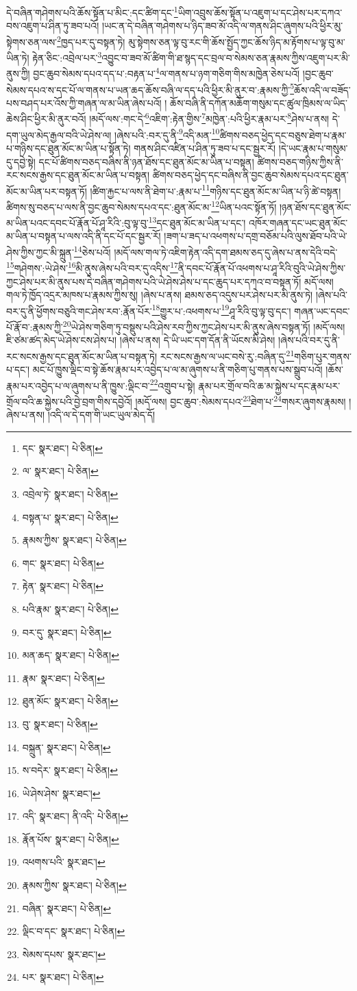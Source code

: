 དེ་བཞིན་གཤེགས་པའི་ཆོས་སྟོན་པ་མིང་:དང་ཚིག་དང་\footnote{དང་  སྣར་ཐང་།  པེ་ཅིན། }ཡིག་འབྲུས་ཆོས་སྟོན་པ་འཇུག་པ་དང་ཤེས་པར་དཀའ་བས་འཇུག་པ་ཤིན་ཏུ་ཟབ་པའོ། །ཡང་ན་དེ་བཞིན་གཤེགས་པ་ཉིད་ཟབ་མོ་འདི་ལ་གནས་ཤིང་ཞུགས་པའི་ཕྱིར་མུ་སྟེགས་ཅན་ལས་\footnote{ལ་  སྣར་ཐང་།  པེ་ཅིན། }ཁྱད་པར་དུ་བསྟན་ཏེ། མུ་སྟེགས་ཅན་ལྟ་བུ་རང་གི་ཆོས་སྤྱོད་ཀྱང་ཆོས་ཉིད་མ་རྟོགས་པ་ལྟ་བུ་མ་ཡིན་ཏེ། རྟེན་ཅིང་:འབྲེལ་པར་\footnote{འབྲེལ་ཏེ་  སྣར་ཐང་།  པེ་ཅིན། }འབྱུང་བ་ཟབ་མོ་ཚིག་གི་ཐ་སྙད་དང་བྲལ་བ་སེམས་ཅན་རྣམས་ཀྱིས་འཇུག་པར་མི་ནུས་ཀྱི། བྱང་ཆུབ་སེམས་དཔའ་དད་པ་:བརྟན་པ་\footnote{བསྟན་པ་  སྣར་ཐང་།  པེ་ཅིན། }ལ་གནས་པ་ཉག་གཅིག་གིས་མཁྱེན་ཅེས་པའོ། །བྱང་ཆུབ་སེམས་དཔའ་ས་དང་པོ་ལ་གནས་པ་ཡན་ཆད་ཆོས་བཞི་ལ་དད་པའི་ཕྱིར་མི་ནུར་བ་:རྣམས་ཀྱི་\footnote{རྣམས་ཀྱིས་  སྣར་ཐང་།  པེ་ཅིན། }ཆོས་འདི་ལ་བཟོད་པས་བཤད་པར་འོས་ཀྱི་གཞན་ལ་མ་ཡིན་ཞེས་པའོ། །
ཆོས་བཞི་ནི་དཀོན་མཆོག་གསུམ་དང་ཚུལ་ཁྲིམས་ལ་ཡིད་ཆེས་ཤིང་ཕྱིར་མི་ནུར་བའོ། །མདོ་ལས་:གང་དེ་\footnote{གང་  སྣར་ཐང་།  པེ་ཅིན། }འཇིག་:རྟེན་གྱིས་\footnote{རྟེན་  སྣར་ཐང་།  པེ་ཅིན། }མཁྱེན་:པའི་ཕྱིར་རྣམ་པར་\footnote{པའི་རྣམ་  སྣར་ཐང་།  པེ་ཅིན། }ཤེས་པ་ནས། དེ་དག་ཡུལ་མེད་རྒྱལ་བའི་ཡེ་ཤེས་ལ། །ཞེས་པའི་:བར་དུ་ནི་\footnote{བར་དུ་  སྣར་ཐང་།  པེ་ཅིན། }འདི་མན་\footnote{མན་ཆད་  སྣར་ཐང་།  པེ་ཅིན། }ཚིགས་བཅད་ཕྱེད་དང་བཅུས་ཐེག་པ་རྣམ་པ་གཉིས་དང་ཐུན་མོང་མ་ཡིན་པ་སྟོན་ཏེ། གནས་ཤིང་འཛིན་པ་ཤིན་ཏུ་ཟབ་པ་དང་སྦྱར་རོ། །དེ་ཡང་རྣམ་པ་གསུམ་དུ་དབྱེ་སྟེ། དང་པོ་ཚིགས་བཅད་བཞིས་ནི་ཉན་ཐོས་དང་ཐུན་མོང་མ་ཡིན་པ་བསྟན། ཚིགས་བཅད་གཉིས་ཀྱིས་ནི་རང་སངས་རྒྱས་དང་ཐུན་མོང་མ་ཡིན་པ་བསྟན། ཚིགས་བཅད་ཕྱེད་དང་བཞིས་ནི་བྱང་ཆུབ་སེམས་དཔའ་དང་ཐུན་མོང་མ་ཡིན་པར་བསྟན་ཏོ། །ཚིག་རྐྱང་པ་ལས་ནི་ཐེག་པ་:རྣམ་པ་\footnote{རྣམ་  སྣར་ཐང་།  པེ་ཅིན། }གཉིས་དང་ཐུན་མོང་མ་ཡིན་པ་ཉི་ཚེ་བསྟན། ཚིགས་སུ་བཅད་པ་ལས་ནི་བྱང་ཆུབ་སེམས་དཔའ་དང་:ཐུན་མོང་མ་\footnote{ཐུན་མོང་  སྣར་ཐང་།  པེ་ཅིན། }ཡིན་པའང་སྟོན་ཏོ། །ཉན་ཐོས་དང་ཐུན་མོང་མ་ཡིན་པའང་དབང་པོ་རྣོན་པོ་ཤཱ་རིའི་:བུ་ལྟ་བུ་\footnote{བུ་  སྣར་ཐང་།  པེ་ཅིན། }དང་ཐུན་མོང་མ་ཡིན་པ་དང་། འཁོར་གཞན་དང་ཡང་ཐུན་མོང་མ་ཡིན་པ་བསྟན་པ་ལས་འདི་ནི་དང་པོ་དང་སྦྱར་རོ། །ཟག་པ་ཟད་པ་འཕགས་པ་དགྲ་བཅོམ་པའི་ལུས་ཐོབ་པའི་ཡེ་ཤེས་ཀྱིས་ཀྱང་མི་སྐྲུན་\footnote{བསྐྲུན་  སྣར་ཐང་།  པེ་ཅིན། }ཅེས་པའོ། །མདོ་ལས་གལ་ཏེ་འཇིག་རྟེན་འདི་དག་ཐམས་ཅད་དུ་ཞེས་པ་ནས་དེའི་བདེ་\footnote{ས་བདེར་  སྣར་ཐང་།  པེ་ཅིན། }གཤེགས་:ཡེ་ཤེས་\footnote{ཡེ་ཤེས་ཤེས་  སྣར་ཐང་། }མི་ནུས་ཞེས་པའི་བར་དུ་འདིས་\footnote{འདི་  སྣར་ཐང་། ནི་འདི་  པེ་ཅིན། }ནི་དབང་པོ་རྣོན་པོ་འཕགས་པ་ཤཱ་རིའི་བུའི་ཡེ་ཤེས་ཀྱིས་ཀྱང་ཤེས་པར་མི་ནུས་པས་དེ་བཞིན་གཤེགས་པའི་ཡེ་ཤེས་ཤེས་པ་དང་ཆུད་པར་དཀའ་བ་བསྟན་ཏོ། མདོ་ལས། གལ་ཏེ་ཁྱོད་འདྲར་མཁས་པ་རྣམས་ཀྱིས་སུ། །ཞེས་པ་ནས། ཐམས་ཅད་འདུས་པར་ཤེས་པར་མི་ནུས་ཏེ། །ཞེས་པའི་བར་དུ་ནི་ཕྱོགས་བཅུའི་གང་ཤེས་རབ་:རྣོན་པོར་\footnote{རྣོན་པོས་  སྣར་ཐང་།  པེ་ཅིན། }གྱུར་པ་:འཕགས་པ་\footnote{འཕགས་པའི་  སྣར་ཐང་། }ཤཱ་རིའི་བུ་ལྟ་བུ་དང་། གཞན་ཡང་དབང་པོ་རྣོ་བ་:རྣམས་ཀྱི་\footnote{རྣམས་ཀྱིས་  སྣར་ཐང་།  པེ་ཅིན། }ཡེ་ཤེས་གཅིག་ཏུ་བསྡུས་པའི་ཤེས་རབ་ཀྱིས་ཀྱང་ཤེས་པར་མི་ནུས་ཞེས་བསྟན་ཏོ། །མདོ་ལས། ཇི་ཙམ་ཚད་མེད་ཡེ་ཤེས་ངས་ཤེས་པ། །ཞེས་པ་ནས། དེ་ཡི་ཡང་དག་དོན་ནི་ཡོངས་མི་ཤེས། །ཞེས་པའི་བར་དུ་ནི་རང་སངས་རྒྱས་དང་ཐུན་མོང་མ་ཡིན་པ་བསྟན་ཏེ། རང་སངས་རྒྱས་ལ་ཡང་བསེ་རུ་:བཞིན་དུ་\footnote{བཞིན་  སྣར་ཐང་།  པེ་ཅིན། }གཅིག་པུར་གནས་པ་དང་། མང་པོ་ཁྱུས་ལྡིང་བ་སྟེ་ཆོས་རྣམ་པར་འབྱེད་པ་ལ་མ་ཞུགས་པ་ནི་གཅིག་པུ་གནས་པས་སྒྲུབ་པའོ། །ཆོས་རྣམ་པར་འབྱེད་པ་ལ་ཞུགས་པ་ནི་ཁྱུས་:ལྡིང་བ་\footnote{ལྡིང་བ་དང་  སྣར་ཐང་།  པེ་ཅིན། }འགྲུབ་པ་སྟེ། རྣམ་པར་གྲོལ་བའི་ཆ་མ་སྐྱེས་པ་དང་རྣམ་པར་གྲོལ་བའི་ཆ་སྐྱེས་པའི་བྱེ་བྲག་གིས་དབྱེའོ། །མདོ་ལས། བྱང་ཆུབ་:སེམས་དཔའ་\footnote{སེམས་དཔས་  སྣར་ཐང་། }ཐེག་པ་\footnote{པར་  སྣར་ཐང་།  པེ་ཅིན། }གསར་ཞུགས་རྣམས། །ཞེས་པ་ནས། །འདི་ལ་དེ་དག་གི་ཡང་ཡུལ་མེད་དོ། 